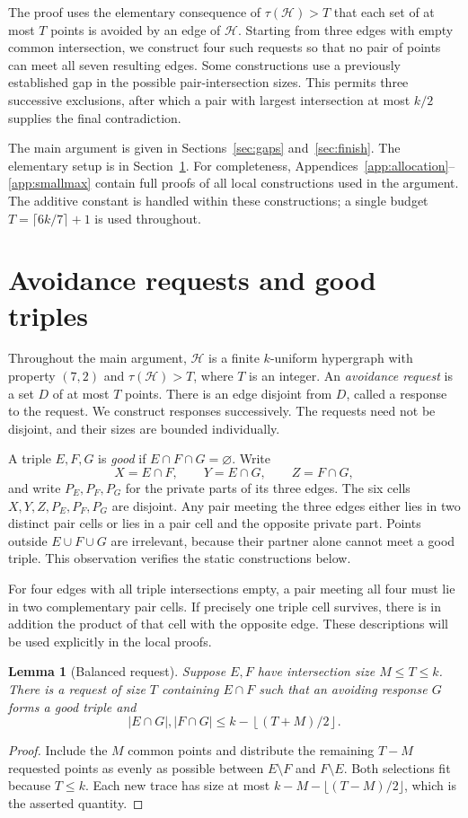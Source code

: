 \documentclass[11pt]{article}
\numberwithin{equation}{section}
\newtheorem{lemma}[theorem]{Lemma}
\theoremstyle{definition}
\theoremstyle{remark}
\newcommand{\HH}{\mathcal H}
\newcommand{\floor}[1]{\left\lfloor #1\right\rfloor}
\begin{document}
The proof uses the elementary consequence of $\tau(\HH)>T$ that each
set of at most $T$ points is avoided by an edge of $\HH$. Starting from
three edges with empty common intersection, we construct four such
requests so that no pair of points can meet all seven resulting edges.
Some constructions use a previously established gap in the possible
pair-intersection sizes. This permits three successive exclusions,
after which a pair with largest intersection at most $k/2$ supplies the
final contradiction.

The main argument is given in Sections~\ref{sec:gaps} and~\ref{sec:finish}.
The elementary setup is in Section~\ref{sec:prelim}. For completeness,
Appendices~\ref{app:allocation}--\ref{app:smallmax} contain full proofs of
all local constructions used in the argument. The additive constant is
handled within these constructions; a single budget
$T=\lceil6k/7\rceil+1$ is used throughout.

\section{Avoidance requests and good triples}\label{sec:prelim}
Throughout the main argument, $\HH$ is a finite $k$-uniform hypergraph
with property $(7,2)$ and $\tau(\HH)>T$, where $T$ is an integer. An \emph{avoidance request} is a set $D$ of at most $T$ points.
There is an edge disjoint from $D$, called a response to the request.
We construct responses successively. The requests need not be disjoint,
and their sizes are bounded individually.

A triple $E,F,G$ is \emph{good} if $E\cap F\cap G=\varnothing$.
Write
\[
 X=E\cap F,\qquad Y=E\cap G,\qquad Z=F\cap G,
\]
and write $P_E,P_F,P_G$ for the private parts of its three edges.
The six cells $X,Y,Z,P_E,P_F,P_G$ are disjoint. Any pair meeting the
three edges either lies in two distinct pair cells or lies in a pair
cell and the opposite private part. Points outside $E\cup F\cup G$
are irrelevant, because their partner alone cannot meet a good triple.
This observation verifies the static constructions below.

For four edges with all triple intersections empty, a pair meeting all
four must lie in two complementary pair cells. If precisely one triple
cell survives, there is in addition the product of that cell with the
opposite edge. These descriptions will be used explicitly in the local
proofs.

\begin{lemma}[Balanced request]\label{lem:balanced}
Suppose $E,F$ have intersection size $M\le T\le k$. There is a request
of size $T$ containing $E\cap F$ such that an avoiding response $G$
forms a good triple and
\[
 |E\cap G|,|F\cap G|\le k-\floor{(T+M)/2}.
\]
\end{lemma}
\begin{proof}
Include the $M$ common points and distribute the remaining $T-M$
requested points as evenly as possible between $E\setminus F$ and
$F\setminus E$. Both selections fit because $T\le k$. Each new trace
has size at most $k-M-\lfloor(T-M)/2\rfloor$, which is the asserted
quantity.
\end{proof}
\end{document}
